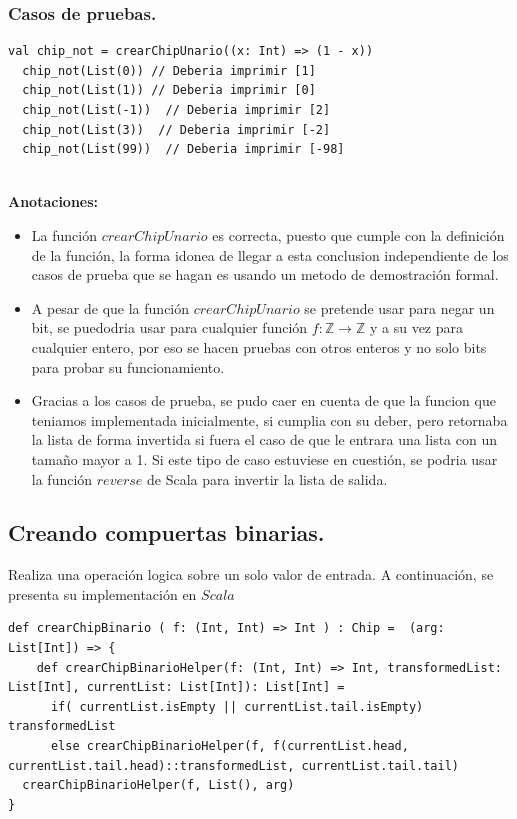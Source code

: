 \documentclass[12pt, a4paper]{article}
\begin{document}
\subsubsection{Casos de pruebas.}
\begin{lstlisting}[style=scalaStyle, caption=Casos de prueba para la función crearChipUnario.]
  val chip_not = crearChipUnario((x: Int) => (1 - x))
  chip_not(List(0)) // Deberia imprimir [1]
  chip_not(List(1)) // Deberia imprimir [0]
  chip_not(List(-1))  // Deberia imprimir [2]
  chip_not(List(3))  // Deberia imprimir [-2]
  chip_not(List(99))  // Deberia imprimir [-98]
  
\end{lstlisting}
\textbf{Anotaciones:} 
\begin{itemize}
  \item La función $crearChipUnario$ es correcta, puesto que cumple con la definición de la función, la forma idonea de llegar a esta conclusion independiente de los casos de prueba que se hagan es usando un metodo de demostración formal.
  \item A pesar de que la función $crearChipUnario$ se pretende usar para negar un bit, se puedodria usar para cualquier función $f: \mathbb{Z} \rightarrow \mathbb{Z}$ y a su vez para cualquier entero, por eso se hacen pruebas con otros enteros y no solo bits para probar su funcionamiento.
  \item Gracias a los casos de prueba, se pudo caer en cuenta de que la funcion que teniamos implementada inicialmente, si cumplia con su deber, pero retornaba la lista de forma invertida si fuera el caso de que le entrara una lista con un tamaño mayor a 1. Si este tipo de caso estuviese en cuestión, se podria usar la función $reverse$ de Scala para invertir la lista de salida.
\end{itemize}
\subsection{Creando compuertas binarias.}
Realiza una operación logica sobre un solo valor de entrada. A continuación, se presenta su implementación en $Scala$ \\
\begin{lstlisting}[style=scalaStyle, caption=Aplica una operación binaria sobre una valor de entrada.]
  def crearChipBinario ( f: (Int, Int) => Int ) : Chip =  (arg: List[Int]) => {
    def crearChipBinarioHelper(f: (Int, Int) => Int, transformedList: List[Int], currentList: List[Int]): List[Int] =
      if( currentList.isEmpty || currentList.tail.isEmpty) transformedList
      else crearChipBinarioHelper(f, f(currentList.head, currentList.tail.head)::transformedList, currentList.tail.tail)
  crearChipBinarioHelper(f, List(), arg)
}
  
\end{lstlisting}
\end{document}
